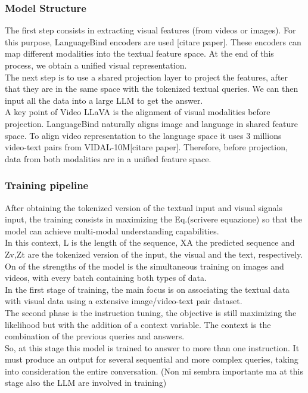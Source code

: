 \documentclass[conference]{IEEEtran}
\begin{document}
\subsubsection{Model Structure}
The first step consists in extracting visual features (from videos or images). For this purpose, LanguageBind encoders are used [citare paper]. These encoders can map different modalities into the textual feature space. At the end of this process, we obtain a unified visual representation.\\ 
The next step is to use a shared projection layer to project the features, after that they are in the same space with the tokenized textual queries. We can then input all the data into a large LLM to get the answer.\\
A key point of Video LLaVA is the alignment of visual modalities before projection. LanguageBind naturally aligns image and language in shared feature space. To align video representation to the language space it uses 3 millions video-text pairs from VIDAL-10M[citare paper]. Therefore, before projection, data from both modalities are in a unified feature space.

\subsubsection{Training pipeline}
After obtaining the tokenized version of the textual input and visual signals input, the training consists in maximizing the Eq.(scrivere equazione) so that the model can achieve multi-modal understanding capabilities.\\
In this context, L is the length of the sequence, XA the predicted sequence and Zv,Zt are the tokenized version of the input, the visual and the text, respectively.\\
On of the strengths of the model is the simultaneous training on images and videos, with every batch containing both types of data.\\
In the first stage of training, the main focus is on associating the textual data with visual data using a extensive image/video-text pair dataset.\\
The second phase is the instruction tuning, the objective is still maximizing the likelihood but with the addition of a context variable. The context is the combination of the previous queries and answers.\\
So, at this stage this model is trained to answer to more than one instruction. It must produce an output for several sequential and more complex queries, taking into consideration the entire conversation.
(Non mi sembra importante ma at this stage also the LLM are involved in training)
\end{document}
